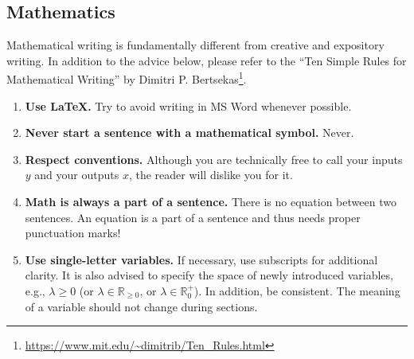 \documentclass[11pt]{article}
\begin{document}
\subsection*{Mathematics}
Mathematical writing is fundamentally different from creative and expository writing. In addition to the advice below, please refer to the ``Ten Simple Rules for Mathematical Writing'' by Dimitri P. Bertsekas\footnote{\url{https://www.mit.edu/~dimitrib/Ten_Rules.html}}.
\begin{enumerate}
    \item \textbf{Use \LaTeX.} Try to avoid writing in MS Word whenever possible.
    
    \item \textbf{Never start a sentence with a mathematical symbol.} Never.
    
    \item \textbf{Respect conventions.} Although you are technically free to call your inputs $y$ and your outputs $x$, the reader will dislike you for it.
    
    \item \textbf{Math is always a part of a sentence.} There is no equation between two sentences. An equation is a part of a sentence and thus needs proper punctuation marks!
    
    \item \textbf{Use single-letter variables.} If necessary, use subscripts for additional clarity. It is also advised to specify the space of newly introduced variables, e.g., $\lambda\geq0$ (or $\lambda\in\mathbb{R}_{\geq0}$, or $\lambda\in\mathbb{R}_0^+$). In addition, be consistent. The meaning of a variable should not change during sections.    
\end{enumerate}
\end{document}
